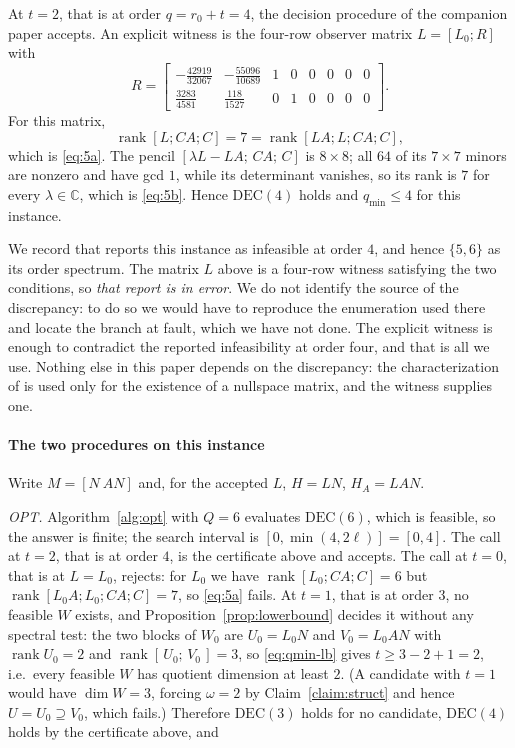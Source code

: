﻿\documentclass[journal]{IEEEtran}
\theoremstyle{plainn}
\theoremstyle{remark}
\begin{document}
At $t=2$, that is at order $q=r_0+t=4$, the decision procedure of the companion paper accepts. An explicit
witness is the four-row observer matrix $L=[L_0;R]$ with
\begin{equation*}
R=\begin{bmatrix}
-\tfrac{42919}{32067} & -\tfrac{55096}{10689} & 1 & 0 & 0 & 0 & 0 & 0\\
\tfrac{3283}{4581} & \tfrac{118}{1527} & 0 & 1 & 0 & 0 & 0 & 0
\end{bmatrix}.
\end{equation*}
For this matrix,
\begin{equation*}
\operatorname{rank}[L;CA;C]=7=\operatorname{rank}[LA;L;CA;C],
\end{equation*}
which is \eqref{eq:5a}. The pencil $[\lambda L-LA;\,CA;\,C]$ is $8\times8$; all $64$ of its
$7\times7$ minors are nonzero and have gcd $1$, while its determinant vanishes, so its rank is $7$
for every $\lambda\in\mathbb C$, which is \eqref{eq:5b}. Hence $\mathrm{DEC}(4)$ holds and
$q_{\min}\le4$ for this instance.

We record that \cite[Sec.~VII-B]{fer26b} reports this instance as infeasible at order $4$, and
hence $\{5,6\}$ as its order spectrum. The matrix $L$ above is a four-row witness satisfying the
two conditions, so \emph{that report is in error}. We do not identify the source of the discrepancy:
to do so we would have to reproduce the enumeration used there and locate the branch at fault, which
we have not done. The explicit witness is enough to contradict the reported infeasibility at order
four, and that is all we use. Nothing else in this paper depends on the discrepancy: the
characterization of \cite{fer26b} is used only for the existence of a nullspace matrix, and the
witness supplies one.

\paragraph*{The two procedures on this instance}
Write $M=[N\ AN]$ and, for the accepted $L$, $H=LN$, $H_A=LAN$.

\emph{OPT.} Algorithm~\ref{alg:opt} with $Q=6$ evaluates $\mathrm{DEC}(6)$, which is feasible, so the
answer is finite; the search interval is $[0,\min(4,2\ell)]=[0,4]$. The call at $t=2$, that is at
order $4$, is the certificate above and accepts. The call at $t=0$, that is at $L=L_0$, rejects: for
$L_0$ we have $\operatorname{rank}[L_0;CA;C]=6$ but $\operatorname{rank}[L_0A;L_0;CA;C]=7$, so
\eqref{eq:5a} fails. At $t=1$, that is at order $3$, no feasible $W$ exists, and Proposition~\ref{prop:lowerbound}
decides it without any spectral test: the two blocks of $W_0$ are $U_0=L_0N$ and $V_0=L_0AN$ with
$\operatorname{rank}U_0=2$ and $\operatorname{rank}[\,U_0;\,V_0\,]=3$, so \eqref{eq:qmin-lb} gives
$t\ge3-2+1=2$, i.e.\ every feasible $W$ has quotient dimension at least $2$. (A candidate with $t=1$
would have $\dim W=3$, forcing $\omega=2$ by Claim~\ref{claim:struct} and hence $U=U_0\supseteq V_0$,
which fails.) Therefore $\mathrm{DEC}(3)$ holds for no candidate, $\mathrm{DEC}(4)$ holds by the
certificate above, and
\end{document}
